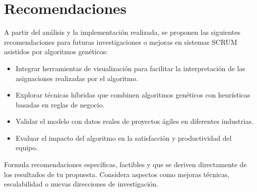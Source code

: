 \section{Recomendaciones}

A partir del análisis y la implementación realizada, se proponen las siguientes recomendaciones para futuras investigaciones o mejoras en sistemas SCRUM asistidos por algoritmos genéticos:

\begin{itemize}
    \item Integrar herramientas de visualización para facilitar la interpretación de las asignaciones realizadas por el algoritmo.
    \item Explorar técnicas híbridas que combinen algoritmos genéticos con heurísticas basadas en reglas de negocio.
    \item Validar el modelo con datos reales de proyectos ágiles en diferentes industrias.
    \item Evaluar el impacto del algoritmo en la satisfacción y productividad del equipo.
\end{itemize}

\vspace{0.5cm}

\begin{tcolorbox}[colback=gray!10, colframe=black!30, title={Sugerencia para esta sección}]
    Formula recomendaciones específicas, factibles y que se deriven directamente de los resultados de tu propuesta. Considera aspectos como mejoras técnicas, escalabilidad o nuevas direcciones de investigación.
\end{tcolorbox}
